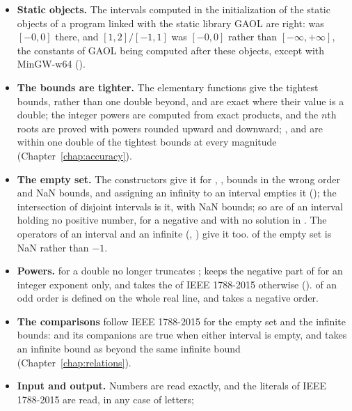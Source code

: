 \begin{itemize}
\item[$\bullet$] \textbf{Static objects.} The intervals computed in the
  initialization of the static objects of a program linked with the static
  library GAOL are right:  was $[-0, 0]$ there, and
  $[1, 2]/[-1, 1]$ was $[-0, 0]$ rather than $[-\infty, +\infty]$, the
  constants of GAOL being computed after these objects, except with MinGW-w64
  ().
\item[$\bullet$] \textbf{The bounds are tighter.} The elementary functions
  give the tightest bounds, rather than one double beyond, and are exact
  where their value is a double; the integer powers are
  computed from exact products, and the $n$th roots are proved with powers
  rounded upward and downward; ,  and  are
  within one double of the tightest bounds at every magnitude
  (Chapter~\ref{chap:accuracy}).
\item[$\bullet$] \textbf{The empty set.} The constructors give it for
  \itv{+\infty}{+\infty}, \itv{-\infty}{-\infty}, bounds in the wrong order
  and NaN bounds, and assigning an infinity to an interval empties it
  (); the intersection of disjoint intervals is it,
  with NaN bounds; so are  of an interval holding no positive
  number,  for a negative  and  with
  no solution in . The operators of an interval and an infinite
   (, ) give it too.
   of the empty set is NaN rather than $-1$.
\item[$\bullet$] \textbf{Powers.}  for a double  no
  longer truncates ;  keeps the negative part of
   for an integer exponent only, and takes the  of IEEE
  1788-2015 otherwise ().  of an odd order
  is defined on the whole real line, and takes a negative order.
\item[$\bullet$] \textbf{The comparisons} follow IEEE 1788-2015 for the empty
  set and the infinite bounds:  and its companions are
  true when either interval is empty, and 
  takes an infinite bound as beyond the same infinite bound (Chapter~\ref{chap:relations}).
\item[$\bullet$] \textbf{Input and output.} Numbers are read exactly, and the
  literals of IEEE 1788-2015 are read, in any case of letters;

\end{itemize}
